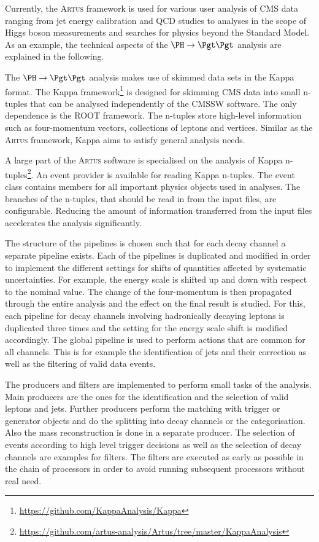 \documentclass[3p]{elsarticle}
\newcommand{\software}[1]{\textsc{#1}\xspace}
\newcommand{\artus}{\software{Artus}}
\begin{document}
Currently, the \artus framework is used for various user analysis of CMS data ranging from jet energy calibration and QCD studies to analyses in the scope of Higgs boson measurements and searches for physics beyond the Standard Model.
As an example, the technical aspects of the $\PH\to\Pgt\Pgt$ analysis are explained in the following.

The $\PH\to\Pgt\Pgt$ analysis makes use of skimmed data sets in the Kappa format.
The Kappa framework\footnote{\url{https://github.com/KappaAnalysis/Kappa}} is designed for skimming CMS data into small n-tuples that can be analysed independently of the CMSSW software.
The only dependence is the ROOT framework.
The n-tuples store high-level information such as four-momentum vectors, collections of leptons and vertices.
Similar as the \artus framework, Kappa aims to satisfy general analysis needs.

A large part of the \artus software is specialised on the analysis of Kappa n-tuples\footnote{\url{https://github.com/artus-analysis/Artus/tree/master/KappaAnalysis}}.
An event provider is available for reading Kappa n-tuples.
The event class contains members for all important physics objects used in analyses.
The branches of the n-tuples, that should be read in from the input files, are configurable.
Reducing the amount of information transferred from the input files accelerates the analysis significantly.

The structure of the pipelines is chosen such that for each decay channel a separate pipeline exists.
Each of the pipelines is duplicated and modified in order to implement the different settings for shifts of quantities affected by systematic uncertainties.
For example, the \Pgt energy scale is shifted up and down with respect to the nominal value.
The change of the \Pgt four-momentum is then propagated through the entire analysis and the effect on the final result is studied.
For this, each pipeline for decay channels involving hadronically decaying \Pgt leptons is duplicated three times and the setting for the \Pgt energy scale shift is modified accordingly.
The global pipeline is used to perform actions that are common for all channels.
This is for example the identification of jets and their correction as well as the filtering of valid data events.

The producers and filters are implemented to perform small tasks of the analysis.
Main producers are the ones for the identification and the selection of valid leptons and jets.
Further producers perform the matching with trigger or generator objects and do the splitting into decay channels or the categorisation.
Also the mass reconstruction is done in a separate producer.
The selection of events according to high level trigger decisions as well as the selection of decay channels are examples for filters.
The filters are executed as early as possible in the chain of processors in order to avoid running subsequent processors without real need.
\end{document}
